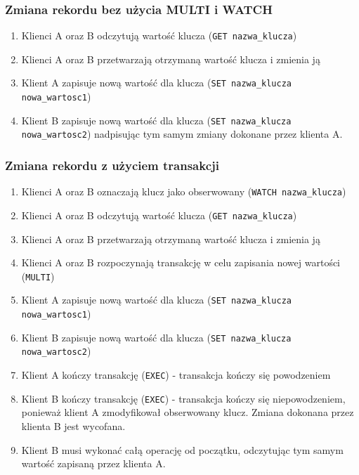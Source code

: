 \subsubsection*{Zmiana rekordu bez użycia MULTI i WATCH}

\begin{enumerate}
 \item Klienci A oraz B odczytują wartość klucza (\verb+GET nazwa_klucza+)
 \item Klienci A oraz B przetwarzają otrzymaną wartość klucza i zmienia ją
 \item Klient A zapisuje nową wartość dla klucza (\verb+SET nazwa_klucza nowa_wartosc1+)
 \item Klient B zapisuje nową wartość dla klucza (\verb+SET nazwa_klucza nowa_wartosc2+) nadpisując tym samym zmiany dokonane przez klienta A.
\end{enumerate}

\subsubsection*{Zmiana rekordu z użyciem transakcji}

\begin{enumerate}
 \item Klienci A oraz B oznaczają klucz jako obserwowany (\verb+WATCH nazwa_klucza+)
 \item Klienci A oraz B odczytują wartość klucza (\verb+GET nazwa_klucza+)
 \item Klienci A oraz B przetwarzają otrzymaną wartość klucza i zmienia ją
 \item Klienci A oraz B rozpoczynają transakcję w celu zapisania nowej wartości (\verb+MULTI+)
 \item Klient A zapisuje nową wartość dla klucza (\verb+SET nazwa_klucza nowa_wartosc1+)
 \item Klient B zapisuje nową wartość dla klucza (\verb+SET nazwa_klucza nowa_wartosc2+)
 \item Klient A kończy transakcję (\verb+EXEC+) - transakcja kończy się powodzeniem
 \item Klient B kończy transakcję (\verb+EXEC+) - transakcja kończy się niepowodzeniem, ponieważ klient A zmodyfikował obserwowany klucz.
 Zmiana dokonana przez klienta B jest wycofana.
 \item Klient B musi wykonać całą operację od początku, odczytując tym samym wartość zapisaną przez klienta A.
\end{enumerate}

